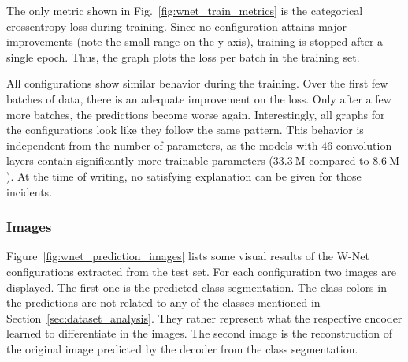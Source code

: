 The only metric shown in Fig.~\ref{fig:wnet_train_metrics} is the categorical crossentropy loss during training. Since no configuration attains major improvements (note the small range on the y-axis), training is stopped after a single epoch. Thus, the graph plots the loss per batch in the training set.

All configurations show similar behavior during the training. Over the first few batches of data, there is an adequate improvement on the loss. Only after a few more batches, the predictions become worse again. Interestingly, all graphs for the configurations look like they follow the same pattern. This behavior is independent from the number of parameters, as the models with $46$ convolution layers contain significantly more trainable parameters ($33.3~\text{M}$ compared to $8.6~\text{M}$). At the time of writing, no satisfying explanation can be given for those incidents.

\subsubsection{Images}
Figure~\ref{fig:wnet_prediction_images} lists some visual results of the W-Net configurations extracted from the test set. For each configuration two images are displayed. The first one is the predicted class segmentation. The class colors in the predictions are not related to any of the classes mentioned in Section~\ref{sec:dataset_analysis}. They rather represent what the respective encoder learned to differentiate in the images. The second image is the reconstruction of the original image predicted by the decoder from the class segmentation.

